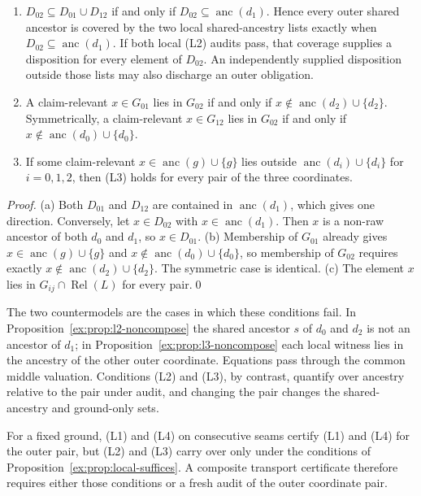 \documentclass[smallextended,envcountsect,envcountsame,natbib]{svjour3}
\begin{document}
\begin{proposition}\label{ex:prop:local-suffices}
\begin{enumerate}
\item[(a)] $D_{02}\subseteq D_{01}\cup D_{12}$ if and only if $D_{02}\subseteq\operatorname{anc}(d_1)$. Hence every outer shared ancestor is covered by the two local shared-ancestry lists exactly when $D_{02}\subseteq\operatorname{anc}(d_1)$. If both local (L2) audits pass, that coverage supplies a disposition for every element of $D_{02}$. An independently supplied disposition outside those lists may also discharge an outer obligation.
\item[(b)] A claim-relevant $x\in G_{01}$ lies in $G_{02}$ if and only if $x\notin\operatorname{anc}(d_2)\cup\{d_2\}$. Symmetrically, a claim-relevant $x\in G_{12}$ lies in $G_{02}$ if and only if $x\notin\operatorname{anc}(d_0)\cup\{d_0\}$.
\item[(c)] If some claim-relevant $x\in\operatorname{anc}(g)\cup\{g\}$ lies outside $\operatorname{anc}(d_i)\cup\{d_i\}$ for $i=0,1,2$, then (L3) holds for every pair of the three coordinates.
\end{enumerate}
\end{proposition}
\begin{proof}
(a) Both $D_{01}$ and $D_{12}$ are contained in $\operatorname{anc}(d_1)$, which gives one direction. Conversely, let $x\in D_{02}$ with $x\in\operatorname{anc}(d_1)$. Then $x$ is a non-raw ancestor of both $d_0$ and $d_1$, so $x\in D_{01}$. (b) Membership of $G_{01}$ already gives $x\in\operatorname{anc}(g)\cup\{g\}$ and $x\notin\operatorname{anc}(d_0)\cup\{d_0\}$, so membership of $G_{02}$ requires exactly $x\notin\operatorname{anc}(d_2)\cup\{d_2\}$. The symmetric case is identical. (c) The element $x$ lies in $G_{ij}\cap\operatorname{Rel}(L)$ for every pair.\qed
\end{proof}

The two countermodels are the cases in which these conditions fail. In Proposition~\ref{ex:prop:l2-noncompose} the shared ancestor $s$ of $d_0$ and $d_2$ is not an ancestor of $d_1$; in Proposition~\ref{ex:prop:l3-noncompose} each local witness lies in the ancestry of the other outer coordinate. Equations pass through the common middle valuation. Conditions (L2) and (L3), by contrast, quantify over ancestry relative to the pair under audit, and changing the pair changes the shared-ancestry and ground-only sets.

\begin{corollary}\label{ex:cor:fresh-outer-audit}
For a fixed ground, (L1) and (L4) on consecutive seams certify (L1) and (L4) for the outer pair, but (L2) and (L3) carry over only under the conditions of Proposition~\ref{ex:prop:local-suffices}. A composite transport certificate therefore requires either those conditions or a fresh audit of the outer coordinate pair.
\end{corollary}
\end{document}
